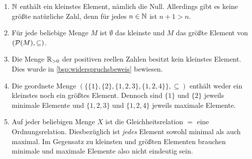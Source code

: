 \begin{bsp} \label{bsp:kleinstes}
    \begin{enumerate}
        \item $\mathbb N$ enthält ein kleinstes Element, nämlich die Null. Allerdings gibt es keine größte natürliche Zahl, denn für jedes $n\in \mathbb N$ ist $n+1>n$.
        \item Für jede beliebige Menge $M$ ist $\emptyset$ das kleinste und $M$ das größte Element von $(\mathcal P(M),\subseteq)$.
        \item Die Menge $\mathbb R_{>0}$ der positiven reellen Zahlen besitzt kein kleinstes Element. Dies wurde in \cref{bsp:widerspruchsbeweis} bewiesen.
        \item Die geordnete Menge $(\{\{1\},\{2\},\{1,2,3\},\{1,2,4\}\},\subseteq)$ enthält weder ein kleinstes noch ein größtes Element. Dennoch sind $\{1\}$ und $\{2\}$ jeweils minimale Elemente und $\{1,2,3\}$ und $\{1,2,4\}$ jeweils maximale Elemente.
        \item Auf jeder beliebigen Menge $X$ ist die Gleichheitsrelation $=$ eine Ordnungsrelation. Diesbezüglich ist \emph{jedes} Element sowohl minimal als auch maximal. Im Gegensatz zu kleinsten und größten Elementen brauchen minimale und maximale Elemente also nicht eindeutig sein.
    \end{enumerate}
\end{bsp}


